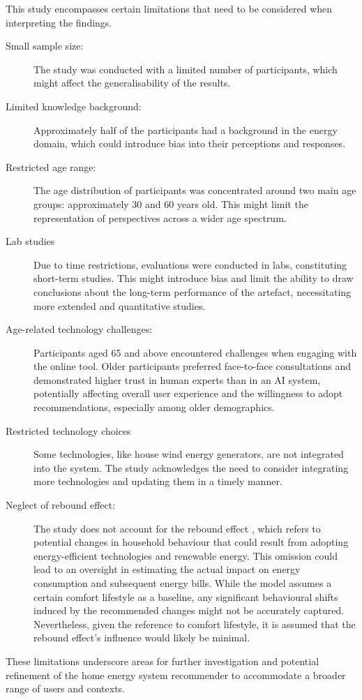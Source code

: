 This study encompasses certain limitations that need to be considered when interpreting the findings.
\begin{description}
    \item[Small sample size:] The study was conducted with a limited number of participants, which might affect the generalisability of the results.
    \item[Limited knowledge background:] Approximately half of the participants had a background in the energy domain, which could introduce bias into their perceptions and responses.
    \item[Restricted age range:] The age distribution of participants was concentrated around two main age groups: approximately 30 and 60 years old. This might limit the representation of perspectives across a wider age spectrum.
    \item[Lab studies] Due to time restrictions, evaluations were conducted in labs, constituting short-term studies. This might introduce bias and limit the ability to draw conclusions about the long-term performance of the artefact, necessitating more extended and quantitative studies.
    \item[Age-related technology challenges:] Participants aged 65 and above encountered challenges when engaging with the online tool. Older participants preferred face-to-face consultations and demonstrated higher trust in human experts than in an AI system, potentially affecting overall user experience and the willingness to adopt recommendations, especially among older demographics.
    \item[Restricted technology choices] Some technologies, like house wind energy generators, are not integrated into the system. The study acknowledges the need to consider integrating more technologies and updating them in a timely manner.
    \item[Neglect of rebound effect:] The study does not account for the rebound effect \cite{Herring2007}, which refers to potential changes in household behaviour that could result from adopting energy-efficient technologies and renewable energy. This omission could lead to an oversight in estimating the actual impact on energy consumption and subsequent energy bills. While the model assumes a certain comfort lifestyle as a baseline, any significant behavioural shifts induced by the recommended changes might not be accurately captured. Nevertheless, given the reference to comfort lifestyle, it is assumed that the rebound effect's influence would likely be minimal.
\end{description}
These limitations underscore areas for further investigation and potential refinement of the home energy system recommender to accommodate a broader range of users and contexts.